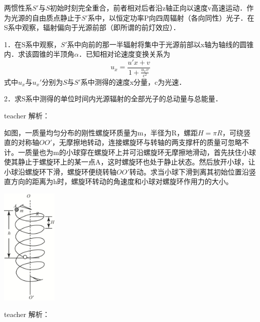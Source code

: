 \begin{example}
	两惯性系$S'$与$S$初始时刻完全重合，前者相对后者沿z轴正向以速度v高速运动．作为光源的自由质点静止于$S'$系中，以恒定功率P向四周辐射（各向同性）光子．在S系中观察，辐射偏向于光源前部（即所谓的前灯效应）．
	
	1．在S系中观察，$S'$系中向前的那一半辐射将集中于光源前部以x轴为轴线的圆锥内．求该圆锥的半顶角$\alpha$．已知相对论速度变换关系为
	\[u_x=\frac{u'x+v}{1+\frac{u_xv}{c^2}}\]
	式中$u_x$与$u_x'$分别为$S$与$S'$系中测得的速度x分量，c为光速．
	
	2．求S系中测得的单位时间内光源辐射的全部光子的总动量与总能量．

\begin{taggedblock}{teacher}
解析：
\end{taggedblock}
\end{example}

\begin{example}
如图，一质量均匀分布的刚性螺旋环质量为m，半径为R，螺距$H=\pi R$，可绕竖直的对称轴$OO'$，无摩擦地转动，连接螺旋环与转轴的两支撑杆的质量可忽略不计。一质量也为m的小球穿在螺旋环上并可沿螺旋环无摩擦地滑动，首先扶住小球使其静止于螺旋环上的某一点A，这时螺旋环也处于静止状态。然后放开小球，让小球沿螺旋环下滑，螺旋环便绕转轴$OO'$转动。求当小球下滑到离其初始位置沿竖直方向的距离为h时，螺旋环转动的角速度和小球对螺旋环作用力的大小。
\begin{flushright}
\includegraphics[width = 0.2\textwidth]{images/problem-4.pdf} 
\end{flushright}
\begin{taggedblock}{teacher}
解析：
\end{taggedblock}
\end{example}


